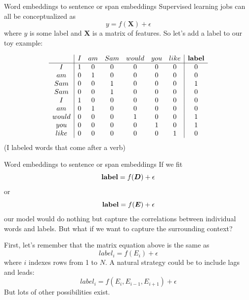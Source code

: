 \documentclass[10pt]{beamer}
\begin{document}
\begin{frame}{Word embeddings to sentence or span embeddings}
Supervised learning jobs can all be conceptualized as 
\[
y = f(\bm{X}) + \epsilon
\]
where $y$ is some label and $\bm{X}$ is a matrix of features.  So let's add a label to our toy example:


\[
\begin{array}{c|cccccc|c}
     & I & am & Sam & would & you & like & \text{\textbf{label}}\\
     \hline
I    & 1 & 0  & 0   & 0     & 0   &  0  & 0\\
am   & 0 & 1  & 0   & 0     & 0   &  0  & 0\\
Sam  & 0 & 0  & 1   & 0     & 0   &  0  & 1\\
Sam  & 0 & 0  & 1   & 0     & 0   &  0  & 0\\
I    & 1 & 0  & 0   & 0     & 0   &  0  & 0\\
am   & 0 & 1  & 0   & 0     & 0   &  0  & 0\\
would& 0 & 0  & 0   & 1     & 0   &  0  & 1\\
you  & 0 & 0  & 0   & 0     & 1   &  0  & 1\\
like & 0 & 0  & 0   & 0     & 0   &  1  & 0\\
\end{array}\] 
(I labeled words that come after a verb)
\end{frame}

\begin{frame}{Word embeddings to sentence or span embeddings}
If we fit 
\[
\text{\textbf{label}} = f(\bm{D}) + \epsilon
\]
or 
\[
\text{\textbf{label}} = f(\bm{E}) + \epsilon
\]
our model would do nothing but capture the correlations between individual words and labels.  But what if we want to capture the surrounding context?

First, let's remember that the matrix equation above is the same as 
\[
label_i = f(E_i) + \epsilon
\]
where $i$ indexes rows from 1 to $N$.  A natural strategy could be to include lags and leads:
\[
label_i = f(E_i, E_{i-1}, E_{i+1}) + \epsilon
\]
But lots of other possibilities exist.
\end{frame}
\end{document}
